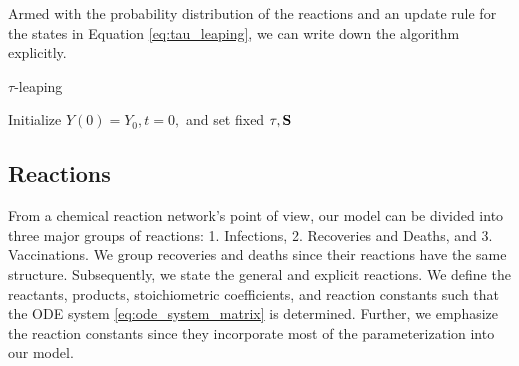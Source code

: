 Armed with the probability distribution of the reactions and an update rule for the states in Equation \eqref{eq:tau_leaping}, we can write down the algorithm explicitly. 

\begin{algorithm}[H]
 \caption{$\tau$-leaping}
 \label{Algo:stochastic}
\SetAlgoLined
{}
 Initialize $Y(0) = Y_0, t=0,$ and set fixed $\tau, \mathbf{S}$\;

\end{algorithm}


\subsection{Reactions}
From a chemical reaction network's point of view, our model can be divided into three major groups of reactions: 1. Infections, 2. Recoveries and Deaths, and 3. Vaccinations. We group recoveries and deaths since their reactions have the same structure. Subsequently, we state the general and explicit reactions. We define the reactants, products, stoichiometric coefficients, and reaction constants such that the ODE system \eqref{eq:ode_system_matrix} is determined. Further, we emphasize the reaction constants since they incorporate most of the parameterization into our model.


